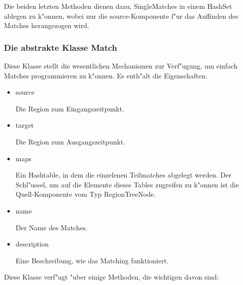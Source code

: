 Die beiden letzten Methoden dienen dazu, SingleMatches in einem HashSet ablegen zu k"onnen, wobei nur die source-Komponente f"ur das Auffinden des Matches herangezogen wird.

\subsubsection{Die abstrakte Klasse Match}
Diese Klasse stellt die wesentlichen Mechanismen zur Verf"ugung, um einfach Matches programmieren zu k"onnen. Es enth"alt die Eigenschaften:
\begin{itemize}
\item source

Die Region zum Eingangszeitpunkt.

\item target

Die Region zum Ausgangszeitpunkt.

\item maps

Ein Hashtable, in dem die einzelenen Teilmatches abgelegt werden. Der Schl"ussel, um auf die Elemente dieses Tables zugreifen zu k"onnen ist die Quell-Komponente vom Typ RegionTreeNode.

\item name

Der Name des Matches.

\item description

Eine Beschreibung, wie das Matching funktioniert.
\end{itemize} 

Diese Klasse verf"ugt "uber einige Methoden, die wichtigen davon  sind:

